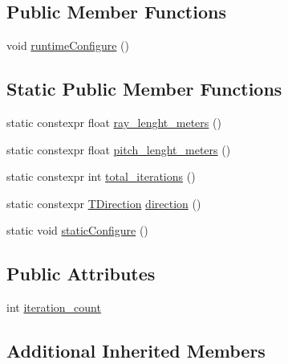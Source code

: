 \subsection*{Public Member Functions}
\begin{DoxyCompactItemize}
\item 
void \hyperlink{structsm__dance__bot__strikes__back_1_1SS4_1_1SsFPattern1_a375b810a59d5791789a249e1904b54f3}{runtime\+Configure} ()
\end{DoxyCompactItemize}
\subsection*{Static Public Member Functions}
\begin{DoxyCompactItemize}
\item 
static constexpr float \hyperlink{structsm__dance__bot__strikes__back_1_1SS4_1_1SsFPattern1_a42e955dfd91252f0785b5e2d28ed5f18}{ray\+\_\+lenght\+\_\+meters} ()
\item 
static constexpr float \hyperlink{structsm__dance__bot__strikes__back_1_1SS4_1_1SsFPattern1_ab98454c837f0c7f01ab14ac30bce718e}{pitch\+\_\+lenght\+\_\+meters} ()
\item 
static constexpr int \hyperlink{structsm__dance__bot__strikes__back_1_1SS4_1_1SsFPattern1_afdb69bd0ef6510bb230e94584b19b063}{total\+\_\+iterations} ()
\item 
static constexpr \hyperlink{namespacesm__dance__bot__strikes__back_1_1f__pattern__states_a606b9ab33830b5491413ff90dc1ea1ac}{T\+Direction} \hyperlink{structsm__dance__bot__strikes__back_1_1SS4_1_1SsFPattern1_a268a3bbf45517f3d39de2f81a925bd99}{direction} ()
\item 
static void \hyperlink{structsm__dance__bot__strikes__back_1_1SS4_1_1SsFPattern1_a331cd5ebbb578ed54a7810b957ee5820}{static\+Configure} ()
\end{DoxyCompactItemize}
\subsection*{Public Attributes}
\begin{DoxyCompactItemize}
\item 
int \hyperlink{structsm__dance__bot__strikes__back_1_1SS4_1_1SsFPattern1_a108e1b3fa97114d7d6a369a344ca21ea}{iteration\+\_\+count}
\end{DoxyCompactItemize}
\subsection*{Additional Inherited Members}


